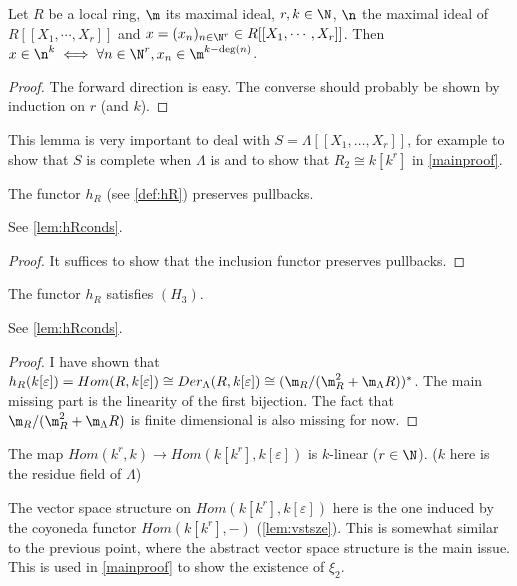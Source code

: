 \begin{lemma}
  \label{lem:mem_maximalideal_pow}
  \leanok
  Let $R$ be a local ring, $\m$ its maximal ideal,
  $r, k \in \N$, $\n$ the maximal ideal of $R[[X_1, \cdots , X_r]]$
  and $x = (x_n)_{n \in \N ^ {r}} \in R[[X_1, \cdots , X_r]]$.
  Then $x \in \n ^ k \iff
  \forall n \in \N ^ {r}, x_n \in \m ^ {k - \deg (n)}$.
\end{lemma}
\begin{proof}
  The forward direction is easy.
  The converse should probably be shown by induction on $r$ (and $k$).
\end{proof}
This lemma is very important to deal with $S = \Lambda[[X_1, \ldots, X_r]]$,
for example to show that $S$ is complete when $\Lambda$ is
and to show that $R_2 \cong k[k^r]$ in \cref{mainproof}.



\begin{lemma}
  \label{lem:preservesPullbackshR}
  \leanok
  The functor $h_R$ (see \cref{def:hR}) preserves pullbacks.
\end{lemma}
See \cref{lem:hRconds}.
\begin{proof}
  It suffices to show that the inclusion functor preserves pullbacks.
\end{proof}


\begin{lemma}
  \label{lem:H3hR}
  \leanok
  The functor $h_R$ satisfies $(H_3)$.
\end{lemma}
See \cref{lem:hRconds}.
\begin{proof}
  I have shown that $h_R(k[\varepsilon]) = Hom(R, k[\varepsilon])
  \cong Der_\Lambda (R, k[\varepsilon])
  \cong (\m_R / (\m_R ^ 2 + \m_\Lambda R))^*$.
  The main missing part is the linearity of the first bijection. The fact that
  $\m_R / (\m_R ^ 2 + \m_\Lambda R)$ is finite
  dimensional is also missing for now.
\end{proof}



\begin{lemma}
  \label{lem:linearequiv_map}
  \leanok
  The map $Hom(k^r, k) \to Hom(k[k^r], k[\varepsilon])$ is $k$-linear ($r \in \N$).
  ($k$ here is the residue field of $\Lambda$)
\end{lemma}
The vector space structure on $Hom(k[k^r], k[\varepsilon])$ here is the one induced by
the coyoneda functor $Hom(k[k^r], -)$ (\cref{lem:vstsze}). This is somewhat similar
to the previous point, where the abstract vector space structure is the main issue.
This is used in \cref{mainproof} to show the existence of $\xi_2$.


